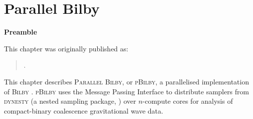 \chapter[Parallel Bilby]{Parallel Bilby}
\label{ch.pbilby}

\textbf{Preamble}

This chapter was originally published as:

\begin{quote}
.
\end{quote}

This chapter describes \textsc{Parallel Bilby}, or \textsc{pBilby}, a parallelised implementation of \textsc{Bilby} \cite{bilby, pbilby}. 
\textsc{pBilby} uses the Message Passing Interface \cite{mpi} to distribute samplers from \textsc{dynesty} (a nested sampling package, \cite{dynesty}) over $n$-compute cores for analysis of compact-binary coalescence gravitational wave data.




